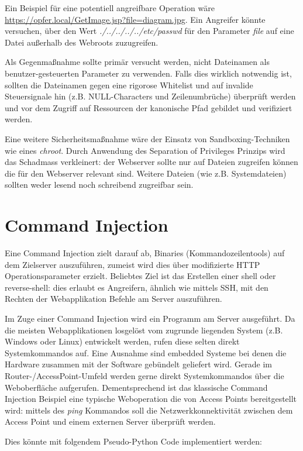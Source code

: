 Ein Beispiel für eine potentiell angreifbare Operation wäre \url{https://opfer.local/GetImage.jsp?file=diagram.jpg}. Ein Angreifer könnte versuchen, über den Wert \textit{./../../../../etc/passwd} für den Parameter \textit{file} auf eine Datei außerhalb des Webroots zuzugreifen.

Als Gegenmaßnahme sollte primär versucht werden, nicht Dateinamen als benutzer-gesteuerten Parameter zu verwenden. Falls dies wirklich notwendig ist, sollten die Dateinamen gegen eine rigorose Whitelist und auf invalide Steuersignale hin (z.B. NULL-Characters und Zeilenumbrüche) überprüft werden und vor dem Zugriff auf Ressourcen der kanonische Pfad gebildet und verifiziert werden.

Eine weitere Sicherheitsmaßnahme wäre der Einsatz von Sandboxing-Techniken wie eines \textit{chroot}. Durch Anwendung des Separation of Privileges Prinzips wird das Schadmass verkleinert: der Webserver sollte nur auf Dateien zugreifen können die für den Webserver relevant sind. Weitere Dateien (wie z.B. Systemdateien) sollten weder lesend noch schreibend zugreifbar sein.

\section{Command Injection}

Eine Command Injection zielt darauf ab, Binaries (Kommandozeilentools) auf dem Zielserver auszuführen, zumeist wird dies über modifizierte HTTP Operationsparameter erzielt. Beliebtes Ziel ist das Erstellen einer shell oder reverse-shell: dies erlaubt es Angreifern, ähnlich wie mittels SSH, mit den Rechten der Webapplikation Befehle am Server auszuführen.

Im Zuge einer Command Injection wird ein Programm am Server ausgeführt. Da die meisten Webapplikationen losgelöst vom zugrunde liegenden System (z.B. Windows oder Linux) entwickelt werden, rufen diese selten direkt Systemkommandos auf. Eine Ausnahme sind embedded Systeme bei denen die Hardware zusammen mit der Software gebündelt geliefert wird. Gerade im Router-/AccessPoint-Umfeld werden gerne direkt Systemkommandos über die Weboberfläche aufgerufen. Dementsprechend ist das klassische Command Injection Beispiel eine typische Weboperation die von Access Points bereitgestellt wird: mittels des \textit{ping} Kommandos soll die Netzwerkkonnektivität zwischen dem Access Point und einem externen Server überprüft werden.

Dies könnte mit folgendem Pseudo-Python Code implementiert werden:

